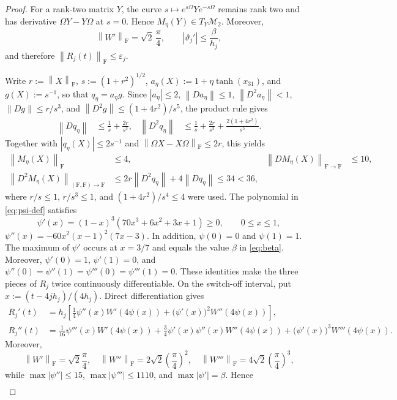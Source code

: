 \documentclass[]{article}
\numberwithin{equation}{section}
\theoremstyle{plain}
\theoremstyle{remark}
\newcommand{\F}{\mathrm F}
\newcommand{\norm}[1]{\left\lVert #1\right\rVert}
\newcommand{\eps}{\varepsilon}
\begin{document}
\begin{proof}
For a rank-two matrix $Y$, the curve
\(s\mapsto e^{s\Omega}Ye^{-s\Omega}\) remains rank two and has derivative
$\Omega Y-Y\Omega$ at $s=0$.  Hence
$M_\eta(Y)\in T_Y\mathcal M_2$.
Moreover,
\[
 \norm{W'}_{\F}=\sqrt2\,\frac\pi4,
 \qquad |\vartheta_j'|\le\frac\beta {h_j},
\]
and therefore \(\norm{R_j(t)}_{\F}\le\eps_j\).

Write $r:=\norm X_{\F}$, $s:=(1+r^2)^{1/2}$,
$a_\eta(X):=1+\eta\tanh(x_{31})$, and $g(X):=s^{-1}$, so that
$q_\eta=a_\eta g$.  Since $|a_\eta|\le2$,
$\norm{Da_\eta}\le1$, $\norm{D^2a_\eta}<1$,
$\norm{Dg}\le r/s^3$, and
$\norm{D^2g}\le(1+4r^2)/s^5$, the product rule gives
\begin{align*}
 \norm{Dq_\eta}&\le\frac1s+\frac{2r}{s^3},&
 \norm{D^2q_\eta}&\le
 \frac1s+\frac{2r}{s^3}+\frac{2(1+4r^2)}{s^5}.
\end{align*}
Together with $|q_\eta(X)|\le2s^{-1}$ and
$\norm{\Omega X-X\Omega}_{\F}\le2r$, this yields
\begin{align*}
 \norm{M_\eta(X)}_{\F}&\le4,&
 \norm{DM_\eta(X)}_{\F\to\F}&\le10,\\
 \norm{D^2M_\eta(X)}_{(\F,\F)\to\F}
 &\le2r\norm{D^2q_\eta}+4\norm{Dq_\eta}\le34<36,
\end{align*}
where $r/s\le1$, $r/s^3\le1$, and $(1+4r^2)/s^4\le4$ were used.
The polynomial in \eqref{eq:psi-def} satisfies
\[
 \psi'(x)=(1-x)^3(70x^3+6x^2+3x+1)\ge0,
 \qquad 0\le x\le1,
\]
$\psi''(x)=-60x^2(x-1)^2(7x-3)$.  In addition,
$\psi(0)=0$ and $\psi(1)=1$.
The maximum of $\psi'$ occurs at $x=3/7$ and equals the value $\beta$ in
\eqref{eq:beta}.  Moreover,
$\psi'(0)=1$, $\psi'(1)=0$, and
$\psi''(0)=\psi''(1)=\psi'''(0)=\psi'''(1)=0$.  These identities make the three
pieces of $R_j$ twice continuously differentiable.  On the switch-off
interval, put $x:=(t-4jh_j)/(4h_j)$.  Direct differentiation gives
\begin{align}
 R_j'(t)
 &=h_j\left[
 \frac14\psi''(x)W'(4\psi(x))
 +\bigl(\psi'(x)\bigr)^2W''(4\psi(x))\right],
 \label{eq:R-first-derivative}\\
 R_j''(t)
 &=\frac1{16}\psi'''(x)W'(4\psi(x))
 +\frac34\psi'(x)\psi''(x)W''(4\psi(x))
 +\bigl(\psi'(x)\bigr)^3W'''(4\psi(x)).
 \label{eq:R-second-derivative}
\end{align}
Moreover,
\[
 \norm{W'}_{\F}=\sqrt2\frac\pi4,\quad
 \norm{W''}_{\F}=2\sqrt2\left(\frac\pi4\right)^2,\quad
 \norm{W'''}_{\F}=4\sqrt2\left(\frac\pi4\right)^3,
\]
while $\max|\psi''|\le15$, $\max|\psi'''|\le1110$, and
$\max|\psi'|=\beta$.  Hence
\begin{align*}

\end{align*}
\end{proof}
\end{document}
